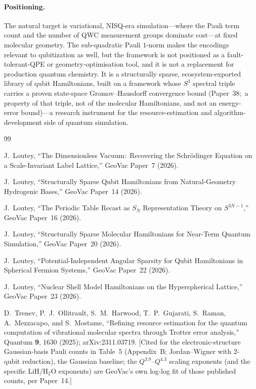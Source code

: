 \documentclass[aps,pra,twocolumn,superscriptaddress,longbibliography]{revtex4-2}
\begin{document}
\paragraph{Positioning.}
The natural target is variational, NISQ-era simulation---where the Pauli
term count and the number of QWC measurement groups dominate cost---at
fixed molecular geometry.  The sub-quadratic Pauli $1$-norm makes the
encodings relevant to qubitization as well, but the framework is not
positioned as a fault-tolerant-QPE or geometry-optimisation tool, and it
is not a replacement for production quantum chemistry.  It is a
structurally sparse, ecosystem-exported library of qubit
Hamiltonians, built on a framework whose $S^{3}$ spectral triple carries a
proven state-space Gromov--Hausdorff convergence bound (Paper~38;\ a
property of that triple, not of the molecular Hamiltonians, and not an
energy-error bound)---a research
instrument for the resource-estimation and algorithm-development side of
quantum simulation.

\begin{thebibliography}{99}

J.~Loutey,
``The Dimensionless Vacuum:\ Recovering the Schr\"odinger Equation on a Scale-Invariant Label Lattice,''
GeoVac Paper~7 (2026).

J.~Loutey,
``Structurally Sparse Qubit Hamiltonians from Natural-Geometry Hydrogenic Bases,''
GeoVac Paper~14 (2026).

J.~Loutey,
``The Periodic Table Recast as $S_N$ Representation Theory on $S^{3N-1}$,''
GeoVac Paper~16 (2026).

J.~Loutey,
``Structurally Sparse Molecular Hamiltonians for Near-Term Quantum Simulation,''
GeoVac Paper~20 (2026).

J.~Loutey,
``Potential-Independent Angular Sparsity for Qubit Hamiltonians in Spherical Fermion Systems,''
GeoVac Paper~22 (2026).

J.~Loutey,
``Nuclear Shell Model Hamiltonians on the Hyperspherical Lattice,''
GeoVac Paper~23 (2026).

D.~Trenev, P.~J.~Ollitrault, S.~M.~Harwood, T.~P.~Gujarati,
S.~Raman, A.~Mezzacapo, and S.~Mostame,
``Refining resource estimation for the quantum computation of
vibrational molecular spectra through Trotter error analysis,''
Quantum \textbf{9}, 1630 (2025); arXiv:2311.03719.
[Cited for the electronic-structure Gaussian-basis Pauli counts in
Table~5 (Appendix~B; Jordan--Wigner with 2-qubit reduction), the
Gaussian baseline; the $Q^{3.9}$--$Q^{4.3}$ scaling exponents (and the
specific LiH/H$_2$O exponents) are GeoVac's own log-log fit of those
published counts, per Paper~14.]

\end{thebibliography}
\end{document}
